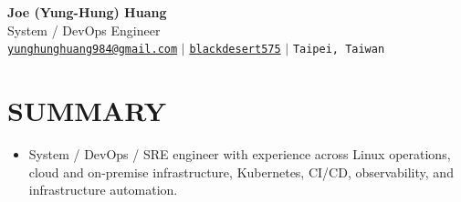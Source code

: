 \documentclass[letterpaper,11pt]{article}
\begin{document}
\begin{center}
    \textbf{\Huge Joe (Yung-Hung) Huang} \\ \vspace{5pt}
    System / DevOps Engineer \\ \vspace{4pt}
    \hspace{1pt} \faEnvelope \hspace{2pt} \texttt{\href{mailto:yunghunghuang984@gmail.com}{yunghunghuang984@gmail.com}} \hspace{1pt} $|$
    \hspace{1pt} \faGithub \hspace{2pt} \texttt{\href{https://github.com/blackdesert575}{blackdesert575}} \hspace{1pt} $|$
    \hspace{1pt} \faMapMarker* \hspace{2pt}\texttt{Taipei, Taiwan}
    \\ \vspace{-3pt}
\end{center}

\section{SUMMARY}
\begin{itemize}[leftmargin=0in, label={}]
  \item\small{System / DevOps / SRE engineer with experience across Linux operations, cloud and on-premise infrastructure, Kubernetes, CI/CD, observability, and infrastructure automation.}
\end{itemize}
\end{document}
